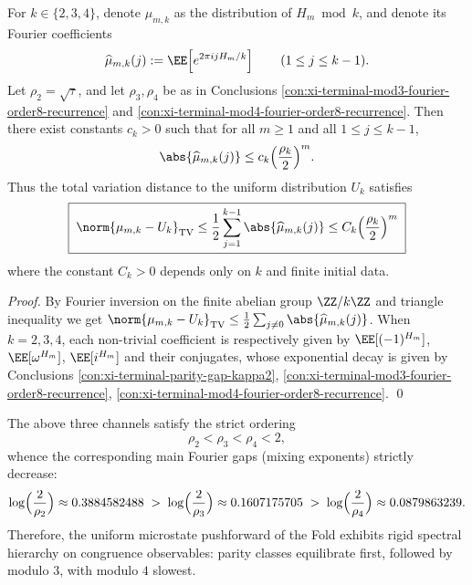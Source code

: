 \begin{conclusion}\label{con:xi-terminal-congruence-mixing-tv-bound}
For \(k\in\{2,3,4\}\), denote \(\mu_{m,k}\) as the distribution of \(H_m\bmod k\), and denote its Fourier coefficients
\[
\widehat{\mu}_{m,k}(j):=\EE\!\left[e^{2\pi i j H_m/k}\right]\qquad(1\le j\le k-1).
\]
Let \(\rho_2=\sqrt{\tau}\), and let \(\rho_3,\rho_4\) be as in Conclusions \ref{con:xi-terminal-mod3-fourier-order8-recurrence} and \ref{con:xi-terminal-mod4-fourier-order8-recurrence}.
Then there exist constants \(c_k>0\) such that for all \(m\ge 1\) and all \(1\le j\le k-1\),
\[
\abs{\widehat{\mu}_{m,k}(j)}\le c_k\Bigl(\frac{\rho_k}{2}\Bigr)^m.
\]
Thus the total variation distance to the uniform distribution \(U_k\) satisfies
\[
\boxed{\;
\norm{\mu_{m,k}-U_k}_{\mathrm{TV}}
\le \frac12\sum_{j=1}^{k-1}\abs{\widehat{\mu}_{m,k}(j)}
\le C_k\Bigl(\frac{\rho_k}{2}\Bigr)^m\;}
\]
where the constant \(C_k>0\) depends only on \(k\) and finite initial data.
\end{conclusion}
\begin{proof}
By Fourier inversion on the finite abelian group \(\ZZ/k\ZZ\) and triangle inequality we get
\(
\norm{\mu_{m,k}-U_k}_{\mathrm{TV}}\le \frac12\sum_{j\ne 0}\abs{\widehat{\mu}_{m,k}(j)}
\).
When \(k=2,3,4\), each non-trivial coefficient is respectively given by
\(\EE[(-1)^{H_m}]\), \(\EE[\omega^{H_m}]\), \(\EE[i^{H_m}]\) and their conjugates,
whose exponential decay is given by Conclusions \ref{con:xi-terminal-parity-gap-kappa2},
\ref{con:xi-terminal-mod3-fourier-order8-recurrence},
\ref{con:xi-terminal-mod4-fourier-order8-recurrence}. \qed
\end{proof}

\begin{conclusion}\label{con:xi-terminal-congruence-mixing-hierarchy}
The above three channels satisfy the strict ordering
\[
\rho_2<\rho_3<\rho_4<2,
\]
whence the corresponding main Fourier gaps (mixing exponents) strictly decrease:
\[
\log\Bigl(\frac{2}{\rho_2}\Bigr)\approx 0.3884582488\;>\;
\log\Bigl(\frac{2}{\rho_3}\Bigr)\approx 0.1607175705\;>\;
\log\Bigl(\frac{2}{\rho_4}\Bigr)\approx 0.0879863239.
\]
Therefore, the uniform microstate pushforward of the Fold exhibits rigid spectral hierarchy on congruence observables: parity classes equilibrate first, followed by modulo \(3\), with modulo \(4\) slowest.
\end{conclusion}

